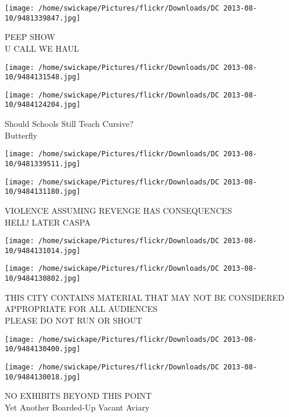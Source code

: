 \documentclass[10pt,letterpaper]{article}
\begin{document}
\vspace{0.25in}
\texttt{[image: /home/swickape/Pictures/flickr/Downloads/DC 2013-08-10/9481339847.jpg]}

PEEP SHOW\\
U CALL WE HAUL\\
\pagebreak

\texttt{[image: /home/swickape/Pictures/flickr/Downloads/DC 2013-08-10/9484131548.jpg]}

\vspace{0.25in}
\texttt{[image: /home/swickape/Pictures/flickr/Downloads/DC 2013-08-10/9484124204.jpg]}

Should Schools Still Teach Cursive?\\
Butterfly\\
\pagebreak

\texttt{[image: /home/swickape/Pictures/flickr/Downloads/DC 2013-08-10/9481339511.jpg]}

\vspace{0.25in}
\texttt{[image: /home/swickape/Pictures/flickr/Downloads/DC 2013-08-10/9484131180.jpg]}

VIOLENCE ASSUMING REVENGE HAS CONSEQUENCES\\
HELL!  LATER CASPA\\
\pagebreak

\texttt{[image: /home/swickape/Pictures/flickr/Downloads/DC 2013-08-10/9484131014.jpg]}

\vspace{0.25in}
\texttt{[image: /home/swickape/Pictures/flickr/Downloads/DC 2013-08-10/9484130802.jpg]}

THIS CITY CONTAINS MATERIAL THAT MAY NOT BE CONSIDERED APPROPRIATE FOR ALL AUDIENCES\\
PLEASE DO NOT RUN OR SHOUT\\
\pagebreak

\texttt{[image: /home/swickape/Pictures/flickr/Downloads/DC 2013-08-10/9484130400.jpg]}

\vspace{0.25in}
\texttt{[image: /home/swickape/Pictures/flickr/Downloads/DC 2013-08-10/9484130018.jpg]}

NO EXHIBITS BEYOND THIS POINT\\
Yet Another Boarded{-}Up Vacant Aviary\\
\pagebreak
\end{document}
